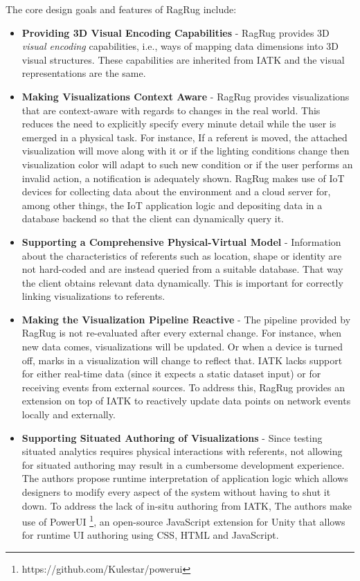 \documentclass{vgtc}                          %
\begin{document}
\smallskip

\noindent The core design goals and features of RagRug include:
\begin{itemize}
	\item \textbf{Providing 3D Visual Encoding Capabilities} -
	      RagRug provides 3D \textit{visual encoding} capabilities, i.e.,
	      ways of mapping data dimensions into 3D visual structures. These
	      capabilities are inherited from IATK and the visual representations
	      are the same.
	\item \textbf{Making Visualizations Context Aware} -
	      RagRug provides visualizations that are context-aware with
	      regards to changes in the real world. This reduces the need to
	      explicitly specify every minute detail while the user is emerged in
	      a physical task. For instance, If a referent is moved, the attached
	      visualization will move along with it or if the lighting conditions
	      change then visualization color will adapt to such new condition
	      or if the user performs an invalid action, a notification is
	      adequately shown. RagRug makes use of IoT devices for collecting data
	      about the environment and a cloud server for, among other things, the
	      IoT application logic and depositing data in a database backend
	      so that the client can dynamically query it.
	\item \textbf{Supporting a Comprehensive Physical-Virtual Model} -
	      Information about the characteristics of referents such as location,
	      shape or identity are not hard-coded and are instead
	      queried from a suitable database. That way the client obtains
	      relevant data dynamically. This is important for correctly linking
	      visualizations to referents.
	\item \textbf{Making the Visualization Pipeline Reactive} -
	      The pipeline provided by RagRug is not re-evaluated after every external
          change. For instance, when new data comes, visualizations will be updated. Or
	      when a device is turned off, marks in a visualization will
	      change to reflect that. IATK lacks support for either real-time
	      data (since it expects a static dataset input) or for receiving
	      events from external sources. To address this, RagRug provides an
	      extension on top of IATK to reactively update data points on network
          events locally and externally.
	\item \textbf{Supporting Situated Authoring of Visualizations} -
	      Since testing situated analytics requires physical interactions with
	      referents, not allowing for situated authoring may result in a
	      cumbersome development experience. The authors propose runtime
	      interpretation of application logic which allows designers to modify
	      every aspect of the system without having to shut it down. To address
	      the lack of in-situ authoring from IATK, The authors make use of
	      PowerUI \footnote{https://github.com/Kulestar/powerui}, an
	      open-source JavaScript extension for Unity that allows for runtime UI
	      authoring using CSS, HTML and JavaScript.
\end{itemize}
\end{document}
